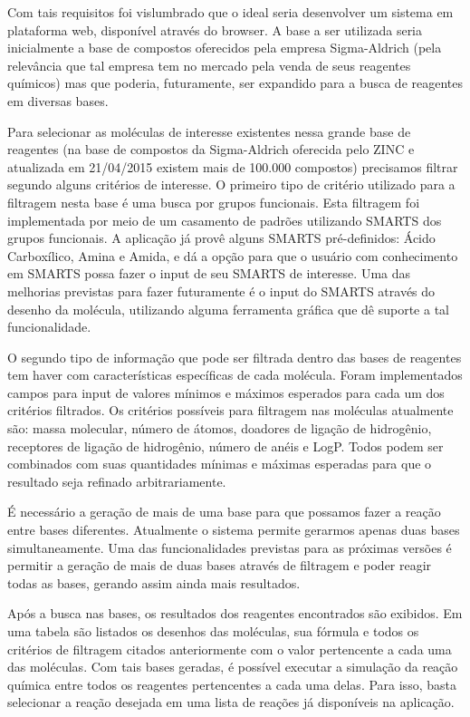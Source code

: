 \documentclass{abnt}
\begin{document}
Com tais requisitos foi vislumbrado que o ideal seria desenvolver um sistema em
plataforma web, disponível através do browser. A base a ser utilizada seria inicialmente
a base de compostos oferecidos pela empresa Sigma-Aldrich (pela relevância que tal
empresa tem no mercado pela venda de seus reagentes químicos) mas que poderia, futuramente,
ser expandido para a busca de reagentes em diversas bases.

Para selecionar as moléculas de interesse existentes nessa grande base de reagentes
(na base de compostos da Sigma-Aldrich oferecida pelo ZINC e atualizada em 21/04/2015
existem mais de 100.000 compostos) precisamos filtrar segundo alguns critérios de
interesse. O primeiro tipo de critério utilizado para a filtragem nesta base é uma
busca por grupos funcionais. Esta filtragem foi implementada por meio de um casamento
de padrões utilizando SMARTS dos grupos funcionais. A aplicação já provê alguns
SMARTS pré-definidos: Ácido Carboxílico, Amina e Amida, e dá a opção para que o
usuário com conhecimento em SMARTS possa fazer o input de seu SMARTS de interesse.
Uma das melhorias previstas para fazer futuramente é o input do SMARTS através do
desenho da molécula, utilizando alguma ferramenta gráfica que dê suporte a tal funcionalidade.

O segundo tipo de informação que pode ser filtrada dentro das bases de reagentes
tem haver com características específicas de cada molécula. Foram implementados
campos para input de valores mínimos e máximos esperados para cada um dos critérios
filtrados. Os critérios possíveis para filtragem nas moléculas atualmente são: massa
molecular, número de átomos, doadores de ligação de hidrogênio, receptores de ligação
de hidrogênio, número de anéis e LogP. Todos podem ser combinados com suas quantidades
mínimas e máximas esperadas para que o resultado seja refinado arbitrariamente.

É necessário a geração de mais de uma base para que possamos fazer a reação entre
bases diferentes. Atualmente o sistema permite gerarmos apenas duas bases simultaneamente.
Uma das funcionalidades previstas para as próximas versões é permitir a geração
de mais de duas bases através de filtragem e poder reagir todas as bases, gerando
assim ainda mais resultados.

Após a busca nas bases, os resultados dos reagentes encontrados são exibidos. Em
uma tabela são listados os desenhos das moléculas, sua fórmula e todos os critérios
de filtragem citados anteriormente com o valor pertencente a cada uma das moléculas.
Com tais bases geradas, é possível executar a simulação da reação química entre todos
os reagentes pertencentes a cada uma delas. Para isso, basta selecionar a reação
desejada em uma lista de reações já disponíveis na aplicação.
\end{document}
